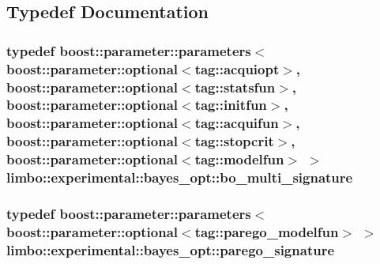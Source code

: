 \subsection{Typedef Documentation}
\hypertarget{namespacelimbo_1_1experimental_1_1bayes__opt_a6dc573f8069efe3be8c162d741c645c5}{}
\subsubsection[{bo\+\_\+multi\+\_\+signature}]{\setlength{\rightskip}{0pt plus 5cm}typedef boost\+::parameter\+::parameters$<$boost\+::parameter\+::optional$<$tag\+::acquiopt$>$, boost\+::parameter\+::optional$<$tag\+::statsfun$>$, boost\+::parameter\+::optional$<$tag\+::initfun$>$, boost\+::parameter\+::optional$<$tag\+::acquifun$>$, boost\+::parameter\+::optional$<$tag\+::stopcrit$>$, boost\+::parameter\+::optional$<$tag\+::modelfun$>$ $>$ {\bf limbo\+::experimental\+::bayes\+\_\+opt\+::bo\+\_\+multi\+\_\+signature}}\label{namespacelimbo_1_1experimental_1_1bayes__opt_a6dc573f8069efe3be8c162d741c645c5}
\hypertarget{namespacelimbo_1_1experimental_1_1bayes__opt_aa1bdc78504860120d6bc0f395f986f57}{}
\subsubsection[{parego\+\_\+signature}]{\setlength{\rightskip}{0pt plus 5cm}typedef boost\+::parameter\+::parameters$<$boost\+::parameter\+::optional$<$tag\+::parego\+\_\+modelfun$>$ $>$ {\bf limbo\+::experimental\+::bayes\+\_\+opt\+::parego\+\_\+signature}}\label{namespacelimbo_1_1experimental_1_1bayes__opt_aa1bdc78504860120d6bc0f395f986f57}
